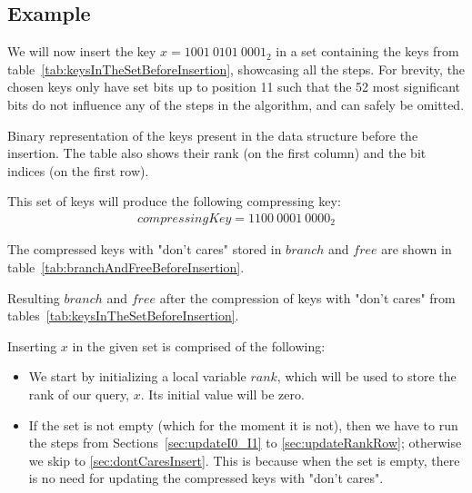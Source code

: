 \subsection{Example} \label{sec:dontCaresInsertExample}

We will now insert the key $x = 1001\ 0101\ 0001_2$ in a set containing the keys from table~\ref{tab:keysInTheSetBeforeInsertion}, showcasing all the steps. For brevity, the chosen keys only have set bits up to position 11 such that the 52 most significant bits do not influence any of the steps in the algorithm, and can safely be omitted.

\begin{table}[H]
\centering

\caption{Binary representation of the keys present in the data structure before the insertion. The table also shows their rank (on the first column) and the bit indices (on the first row).}
\label{tab:keysInTheSetBeforeInsertion}
\end{table}

This set of keys will produce the following compressing key:
\begin{align*}
    compressingKey = 1100\ 0001\ 0000_2
\end{align*}

The compressed keys with "don't cares" stored in $branch$ and $free$ are shown in table~\ref{tab:branchAndFreeBeforeInsertion}.

\begin{table}[H]
\centering

\caption{Resulting $branch$ and $free$ after the compression of keys with "don't cares" from tables~\ref{tab:keysInTheSetBeforeInsertion}.}
\label{tab:branchAndFreeBeforeInsertion}
\end{table}

Inserting $x$ in the given set is comprised of the following:

\begin{itemize}
    \item
    We start by initializing a local variable $rank$, which will be used to store the rank of our query, $x$. Its initial value will be zero.
    
    \item
    If the set is not empty (which for the moment it is not), then we have to run the steps from Sections~\ref{sec:updateI0_I1} to \ref{sec:updateRankRow}; otherwise we skip to \ref{sec:dontCaresInsert}. This is because when the set is empty, there is no need for updating the compressed keys with "don't cares".
\end{itemize}

